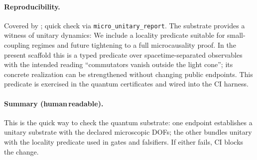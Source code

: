\documentclass[aps,prd,twocolumn,superscriptaddress,nofootinbib,floatfix,longbibliography]{revtex4-2}
\newcommand{\lean}[1]{\texttt{\detokenize{#1}}}
\begin{document}
\paragraph*{Reproducibility.}
Covered by \lean{MicroUnitaryCert}; quick check via \texttt{micro\_unitary\_report}.
The substrate provides a witness of unitary dynamics:
%
We include a locality predicate suitable for small-coupling regimes and future tightening to a full microcausality proof. In the present scaffold this is a typed predicate over spacetime-separated observables with the intended reading ``commutators vanish outside the light cone''; its concrete realization can be strengthened without changing public endpoints. This predicate is exercised in the quantum certificates and wired into the CI harness.
%
\paragraph*{Summary (human\,readable).}
This is the quick way to check the quantum substrate: one endpoint establishes a unitary substrate with the declared microscopic DOFs; the other bundles unitary with the locality predicate used in gates and falsifiers. If either fails, CI blocks the change.
\end{document}
